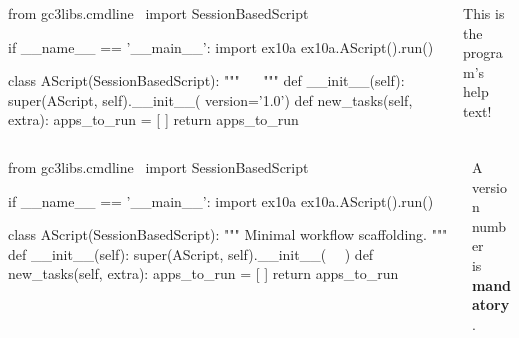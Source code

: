 \documentclass[english,serif,mathserif,xcolor=pdftex,dvipsnames,table]{beamer}
\begin{document}
\begin{frame}[fragile]
  \begin{columns}
    \begin{column}{0.7\linewidth}
\begin{python}
from gc3libs.cmdline \
  import SessionBasedScript

if __name__ == '__main__':
  import ex10a
  ex10a.AScript().run()

class AScript(SessionBasedScript):
  """
  ~~
  """
  def __init__(self):
    super(AScript, self).__init__(
        version='1.0')
  def new_tasks(self, extra):
    apps_to_run = [ ]
    return apps_to_run
\end{python}
    \end{column}
    \begin{column}{0.4\linewidth}
      \begin{flushright}
        This is the \\ program's help text!
      \end{flushright}
    \end{column}
  \end{columns}
\end{frame}


\begin{frame}[fragile]
  \begin{columns}
    \begin{column}{0.7\linewidth}
\begin{python}
from gc3libs.cmdline \
  import SessionBasedScript

if __name__ == '__main__':
  import ex10a
  ex10a.AScript().run()

class AScript(SessionBasedScript):
  """
  Minimal workflow scaffolding.
  """
  def __init__(self):
    super(AScript, self).__init__(
      ~~)
  def new_tasks(self, extra):
    apps_to_run = [ ]
    return apps_to_run
\end{python}
    \end{column}
    \begin{column}{0.4\linewidth}
      \begin{flushright}
        A version number \\ is \textbf{mandatory}.
      \end{flushright}
    \end{column}
  \end{columns}
\end{frame}
\end{document}
